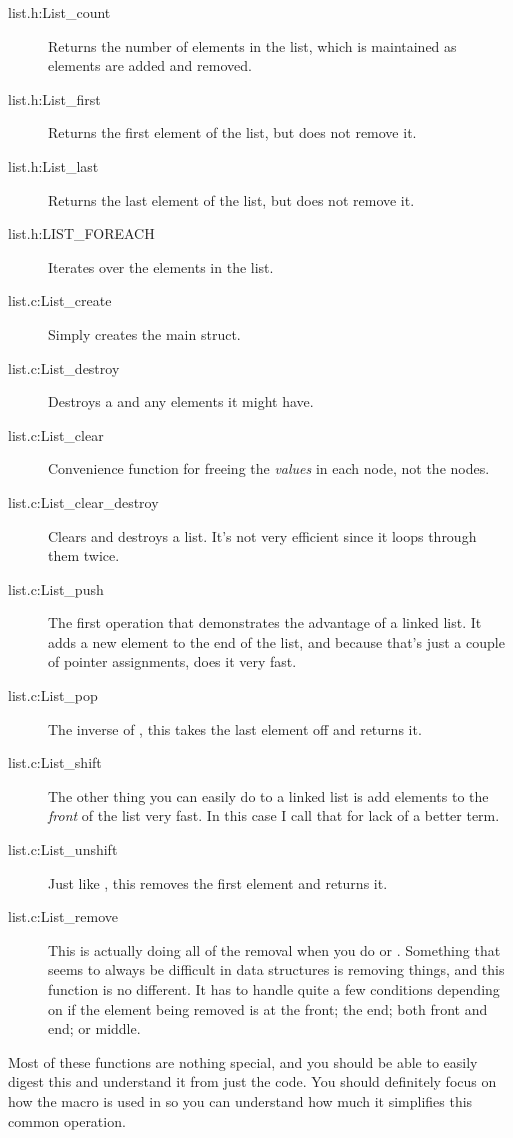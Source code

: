 \begin{description}
\item[list.h:List\_count] Returns the number of elements in the list, which is 
    maintained as elements are added and removed.
\item[list.h:List\_first] Returns the first element of the list, but does not
    remove it.
\item[list.h:List\_last] Returns the last element of the list, but does not
    remove it.
\item[list.h:LIST\_FOREACH] Iterates over the elements in the list.
\item[list.c:List\_create] Simply creates the main  struct.
\item[list.c:List\_destroy] Destroys a  and any elements it might have.
\item[list.c:List\_clear] Convenience function for freeing the \emph{values} in each
    node, not the nodes.
\item[list.c:List\_clear\_destroy] Clears and destroys a list.  It's not very efficient since it loops through them twice.
\item[list.c:List\_push] The first operation that demonstrates the advantage of a
    linked list.  It adds a new element to the end of the list, and because that's
    just a couple of pointer assignments, does it very fast.
\item[list.c:List\_pop] The inverse of , this takes the last
    element off and returns it.
\item[list.c:List\_shift] The other thing you can easily do to a linked list is
    add elements to the \emph{front} of the list very fast.  In this case I call
    that  for lack of a better term.
\item[list.c:List\_unshift] Just like , this removes the first
    element and returns it.
\item[list.c:List\_remove] This is actually doing all of the removal when you do
     or . 
    Something that seems to always be difficult in 
    data structures is removing things, and this function is no different. It
    has to handle quite a few conditions depending on if the element
    being removed is at the front; the end; both front and end; or middle.
\end{description}

Most of these functions are nothing special, and you should be able to easily
digest this and understand it from just the code.  You should definitely focus
on how the  macro is used in  so you
can understand how much it simplifies this common operation.

